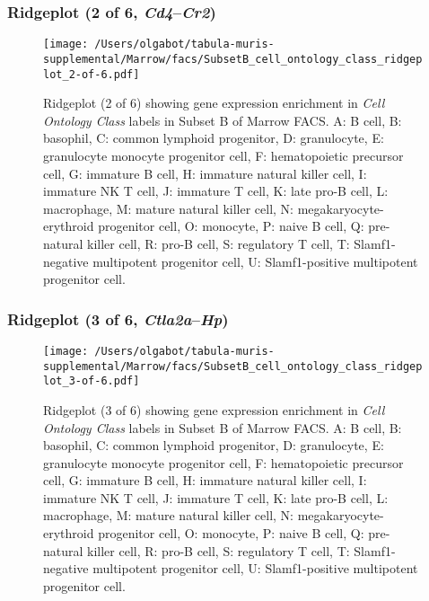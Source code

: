 \subsubsection{Ridgeplot (2 of 6, \emph{Cd4}--\emph{Cr2})}
\begin{figure}[h]
\centering
\texttt{[image: /Users/olgabot/tabula-muris-supplemental/Marrow/facs/SubsetB\_cell\_ontology\_class\_ridgeplot\_2-of-6.pdf]}

\caption{ Ridgeplot (2 of 6)  showing gene expression enrichment in \emph{Cell Ontology Class} labels in Subset B of Marrow FACS. A: B cell, B: basophil, C: common lymphoid progenitor, D: granulocyte, E: granulocyte monocyte progenitor cell, F: hematopoietic precursor cell, G: immature B cell, H: immature natural killer cell, I: immature NK T cell, J: immature T cell, K: late pro-B cell, L: macrophage, M: mature natural killer cell, N: megakaryocyte-erythroid progenitor cell, O: monocyte, P: naive B cell, Q: pre-natural killer cell, R: pro-B cell, S: regulatory T cell, T: Slamf1-negative multipotent progenitor cell, U: Slamf1-positive multipotent progenitor cell.}
\end{figure}


\clearpage

\subsubsection{Ridgeplot (3 of 6, \emph{Ctla2a}--\emph{Hp})}
\begin{figure}[h]
\centering
\texttt{[image: /Users/olgabot/tabula-muris-supplemental/Marrow/facs/SubsetB\_cell\_ontology\_class\_ridgeplot\_3-of-6.pdf]}

\caption{ Ridgeplot (3 of 6)  showing gene expression enrichment in \emph{Cell Ontology Class} labels in Subset B of Marrow FACS. A: B cell, B: basophil, C: common lymphoid progenitor, D: granulocyte, E: granulocyte monocyte progenitor cell, F: hematopoietic precursor cell, G: immature B cell, H: immature natural killer cell, I: immature NK T cell, J: immature T cell, K: late pro-B cell, L: macrophage, M: mature natural killer cell, N: megakaryocyte-erythroid progenitor cell, O: monocyte, P: naive B cell, Q: pre-natural killer cell, R: pro-B cell, S: regulatory T cell, T: Slamf1-negative multipotent progenitor cell, U: Slamf1-positive multipotent progenitor cell.}
\end{figure}


\clearpage

